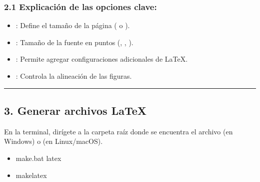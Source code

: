 \documentclass[a4paper,10pt,oneside,spanish,openany]{sphinxmanual}
\begin{document}
\subsubsection{2.1 Explicación de las opciones clave:}
\label{\detokenize{configuracion_inicial/009.Generar_PDF:explicacion-de-las-opciones-clave}}\begin{itemize}
\item {} 
\sphinxAtStartPar
{}: Define el tamaño de la página ( o ).

\item {} 
\sphinxAtStartPar
{}: Tamaño de la fuente en puntos (\sphinxcode{\sphinxupquote{10pt}}, \sphinxcode{\sphinxupquote{11pt}}, \sphinxcode{\sphinxupquote{12pt}}).

\item {} 
\sphinxAtStartPar
{}: Permite agregar configuraciones adicionales de LaTeX.

\item {} 
\sphinxAtStartPar
{}: Controla la alineación de las figuras.

\end{itemize}


\bigskip\hrule\bigskip



\subsection{3. Generar archivos LaTeX}
\label{\detokenize{configuracion_inicial/009.Generar_PDF:generar-archivos-latex}}
\sphinxAtStartPar
En la terminal, dirígete a la carpeta raíz donde se encuentra el archivo  (en Windows) o  (en Linux/macOS).
\begin{itemize}
\item {} 
\sphinxAtStartPar
{}

\begin{sphinxVerbatim}[commandchars=\\\{\}]
make.bat latex
\end{sphinxVerbatim}

\item {} 
\sphinxAtStartPar
{}

\begin{sphinxVerbatim}[commandchars=\\\{\}]
makelatex
\end{sphinxVerbatim}

\end{itemize}
\end{document}
